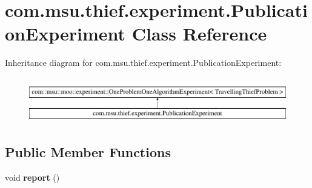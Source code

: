 \hypertarget{classcom_1_1msu_1_1thief_1_1experiment_1_1PublicationExperiment}{\section{com.\-msu.\-thief.\-experiment.\-Publication\-Experiment Class Reference}
\label{classcom_1_1msu_1_1thief_1_1experiment_1_1PublicationExperiment}
}
Inheritance diagram for com.\-msu.\-thief.\-experiment.\-Publication\-Experiment\-:\begin{figure}[H]
\begin{center}
\leavevmode
\includegraphics[height=2.000000cm]{classcom_1_1msu_1_1thief_1_1experiment_1_1PublicationExperiment}
\end{center}
\end{figure}
\subsection*{Public Member Functions}
\begin{DoxyCompactItemize}
\item 
\hypertarget{classcom_1_1msu_1_1thief_1_1experiment_1_1PublicationExperiment_aa7b381d93a130403ca2f27f581c74849}{void {\bfseries report} ()}\label{classcom_1_1msu_1_1thief_1_1experiment_1_1PublicationExperiment_aa7b381d93a130403ca2f27f581c74849}

\end{DoxyCompactItemize}
